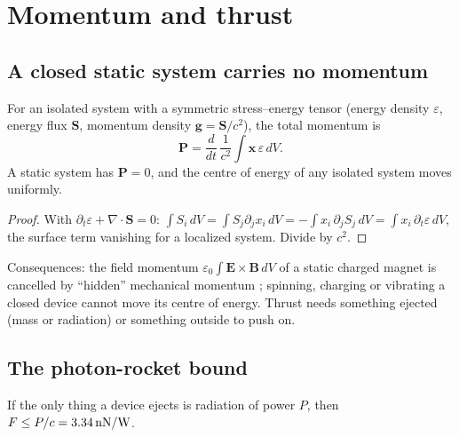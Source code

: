 \section{Momentum and thrust}

\subsection{A closed static system carries no momentum}
\begin{theorem}\label{thm:com}
For an isolated system with a symmetric stress--energy tensor (energy density $\varepsilon$, energy flux $\mathbf S$, momentum density
$\mathbf g=\mathbf S/c^2$), the total momentum is
\begin{equation}
\mathbf P=\frac{d}{dt}\,\frac1{c^2}\int\mathbf x\,\varepsilon\,dV .\label{eq:com}
\end{equation}
A static system has $\mathbf P=0$, and the centre of energy of any isolated system moves uniformly.
\end{theorem}
\begin{proof}
With $\partial_t\varepsilon+\nabla\!\cdot\mathbf S=0$:
$\int S_i\,dV=\int S_j\partial_jx_i\,dV=-\int x_i\,\partial_jS_j\,dV=\int x_i\,\partial_t\varepsilon\,dV$, the surface term vanishing for a localized
system. Divide by $c^2$.
\end{proof}
\noindent Consequences: the field momentum $\varepsilon_0\!\int\mathbf E\times\mathbf B\,dV$ of a static charged magnet is cancelled by ``hidden''
mechanical momentum \cite{coleman}; spinning, charging or vibrating a closed device cannot move its centre of energy. Thrust needs something
ejected (mass or radiation) or something outside to push on.

\subsection{The photon-rocket bound}
\begin{statement}If the only thing a device ejects is radiation of power $P$, then $F\le P/c=3.34\,\mathrm{nN/W}$.\end{statement}

